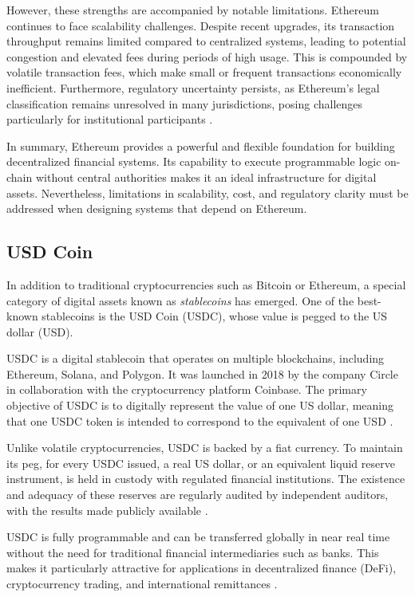 However, these strengths are accompanied by notable limitations.
Ethereum continues to face scalability challenges.
Despite recent upgrades, its transaction throughput remains limited compared to centralized systems, leading to potential congestion and elevated fees during periods of high usage.
This is compounded by volatile transaction fees, which make small or frequent transactions economically inefficient.
Furthermore, regulatory uncertainty persists, as Ethereum’s legal classification remains unresolved in many jurisdictions, posing challenges particularly for institutional participants \cite{eth-3}.


In summary, Ethereum provides a powerful and flexible foundation for building decentralized financial systems.
Its capability to execute programmable logic on-chain without central authorities makes it an ideal infrastructure for digital assets.
Nevertheless, limitations in scalability, cost, and regulatory clarity must be addressed when designing systems that depend on Ethereum.


\subsection{USD Coin}


In addition to traditional cryptocurrencies such as Bitcoin or Ethereum, a special category of digital assets known as \textit{stablecoins} has emerged.
One of the best-known stablecoins is the USD Coin (USDC), whose value is pegged to the US dollar (USD).

USDC is a digital stablecoin that operates on multiple blockchains, including Ethereum, Solana, and Polygon.
It was launched in 2018 by the company Circle in collaboration with the cryptocurrency platform Coinbase.
The primary objective of USDC is to digitally represent the value of one US dollar, meaning that one USDC token is intended to correspond to the equivalent of one USD \cite{usdc-1}.


Unlike volatile cryptocurrencies, USDC is backed by a fiat currency.
To maintain its peg, for every USDC issued, a real US dollar, or an equivalent liquid reserve instrument, is held in custody with regulated financial institutions.
The existence and adequacy of these reserves are regularly audited by independent auditors, with the results made publicly available \cite{usdc-2}.


USDC is fully programmable and can be transferred globally in near real time without the need for traditional financial intermediaries such as banks.
This makes it particularly attractive for applications in decentralized finance (DeFi), cryptocurrency trading, and international remittances \cite{circle-usdc}.



